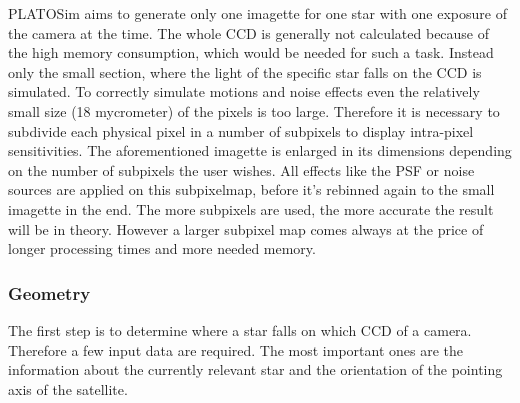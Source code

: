 PLATOSim aims to generate only one imagette for one star with one exposure of the camera at the time. The whole CCD is generally not calculated because of the high memory consumption, which would be needed for such a task. Instead only the small section, where the light of the specific star falls on the CCD is simulated.
\newline
To correctly simulate motions and noise effects even the relatively small size (18 mycrometer) of the pixels is too large. Therefore it is necessary to subdivide each physical pixel in a number of subpixels to display intra-pixel sensitivities. The aforementioned imagette is enlarged in its dimensions depending on the number of subpixels the user wishes. All effects like the PSF or noise sources are applied on this subpixelmap, before it's rebinned again to the small imagette in the end. The more subpixels are used, the more accurate the result will be in theory.  However a larger subpixel map comes always at the price of longer processing times and more needed memory. 

\subsubsection{Geometry}
The first step is to determine where a star falls on which CCD of a camera. Therefore a few input data are required. The most important ones are the information about the currently 			relevant star and the orientation of the pointing axis of the satellite.

